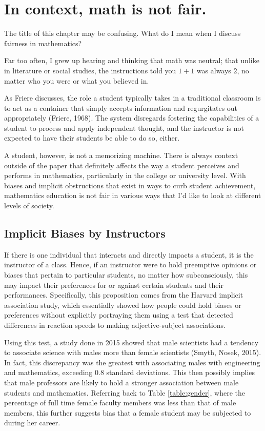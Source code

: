 \chapter{In context, math is not fair.}

The title of this chapter may be confusing. What do I mean when I discuss fairness in mathematics?

Far too often, I grew up hearing and thinking that math was neutral; that unlike in literature or social studies, the instructions told you $1+1$ was always $2$, no matter who you were or what you believed in.

As Friere discusses, the role a student typically takes in a traditional classroom is to act as a container that simply accepts information and regurgitates out appropriately (Friere, 1968). The system disregards fostering the capabilities of a student to process and apply independent thought, and the instructor is not expected to have their students be able to do so, either.

A student, however, is not a memorizing machine. There is always context outside of the paper that definitely affects the way a student perceives and performs in mathematics, particularly in the college or university level. With biases and implicit obstructions that exist in ways to curb student achievement, mathematics education is not fair in various ways that I'd like to look at different levels of society.

\section{Implicit Biases by Instructors}
If there is one individual that interacts and directly impacts a student, it is the instructor of a class. Hence, if an instructor were to hold preemptive opinions or biases that pertain to particular students, no matter how subconsciously, this may impact their preferences for or against certain students and their performances. Specifically, this proposition comes from the Harvard implicit association study, which essentially showed how people could hold biases or preferences without explicitly portraying them using a test that detected differences in reaction speeds to making  adjective-subject associations.

Using this test, a study done in 2015 showed that male scientists had a tendency to associate science with males more than female scientists (Smyth, Nosek, 2015). In fact, this discrepancy was the greatest with associating males with engineering and mathematics, exceeding 0.8 standard deviations. This then possibly implies that male professors are likely to hold a stronger association between male students and mathematics. Referring back to Table \ref{table:gender}, where the percentage of full time female faculty members was less than that of male members, this further suggests bias that a female student may be subjected to during her career.

